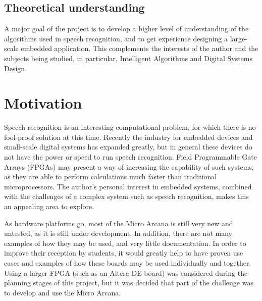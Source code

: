 	\subsection{Theoretical understanding} %
	\label{sec:theoretical_understanding}
		A major goal of the project is to develop a higher level of understanding of the algorithms used in speech recognition, and to get experience designing a large-scale embedded application.  This complements the interests of the author and the subjects being studied, in particular, Intelligent Algorithms and Digital Systems Design.


\section{Motivation} %
\label{sec:motivation}
	Speech recognition is an interesting computational problem, for which there is no fool-proof solution at this time.  Recently the industry for embedded devices and small-scale digital systems has expanded greatly, but in general these devices do not have the power or speed to run speech recognition.  Field Programmable Gate Arrays (FPGAs) may present a way of increasing the capability of such systems, as they are able to perform calculations much faster than traditional microprocessors.  The author's personal interest in embedded systems, combined with the challenges of a complex system such as speech recognition, makes this an appealing area to explore.

	As hardware platforms go, most of the Micro Arcana is still very new and untested, as it is still under development.  In addition, there are not many examples of how they may be used, and very little documentation.  In order to improve their reception by students, it would greatly help to have proven use cases and examples of how these boards may be used individually and together.  Using a larger FPGA (such as an Altera DE board) was considered during the planning stages of this project, but it was decided that part of the challenge was to develop and use the Micro Arcana.

